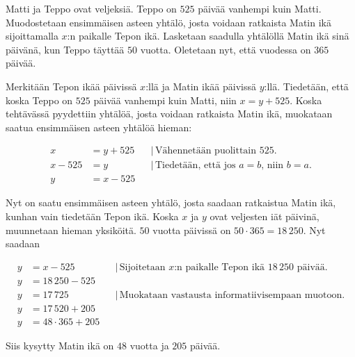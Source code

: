 \begin{esimerkki} 
Matti ja Teppo ovat veljeksiä. Teppo on $525$ päivää vanhempi kuin Matti. Muodostetaan ensimmäisen asteen yhtälö, josta voidaan ratkaista Matin ikä sijoittamalla $x$:n paikalle Tepon ikä. Lasketaan saadulla yhtälöllä Matin ikä sinä päivänä, kun Teppo täyttää $50$ vuotta. Oletetaan nyt, että vuodessa on $365$ päivää.

Merkitään Tepon ikää päivissä $x$:llä ja Matin ikää päivissä $y$:llä. Tiedetään, että koska Teppo on $525$ päivää vanhempi kuin Matti, niin $x=y+525$. Koska tehtävässä pyydettiin yhtälöä, josta voidaan ratkaista Matin ikä, muokataan saatua ensimmäisen asteen yhtälöä hieman:

      \begin{align*}
	   x &= y+525 & &| \, \text{Vähennetään puolittain 525.} \\
	   x-525 &= y & &| \, \text{Tiedetään, että jos $a=b$, niin $b=a$.} \\
	   y &= x-525 & &
      \end{align*}
      
Nyt on saatu ensimmäisen asteen yhtälö, josta saadaan ratkaistua Matin ikä, kunhan vain tiedetään Tepon ikä. Koska $x$ ja $y$ ovat veljesten iät päivinä, muunnetaan hieman yksiköitä. $50$ vuotta päivissä on $50 \cdot 365 = 18\,250$. Nyt saadaan

      \begin{align*}
	  y &= x-525 & &| \, \text{Sijoitetaan $x$:n paikalle Tepon ikä $18\,250$ päivää.} \\
	  y &= 18\,250-525 & & \\
	  y &= 17\,725 & &| \, \text{Muokataan vastausta informatiivisempaan muotoon.} \\
	  y &= 17\,520+205 & & \\
	  y &= 48 \cdot 365 +205 & &
      \end{align*}
      
      Siis kysytty Matin ikä on $48$ vuotta ja $205$ päivää.
  
\end{esimerkki}

